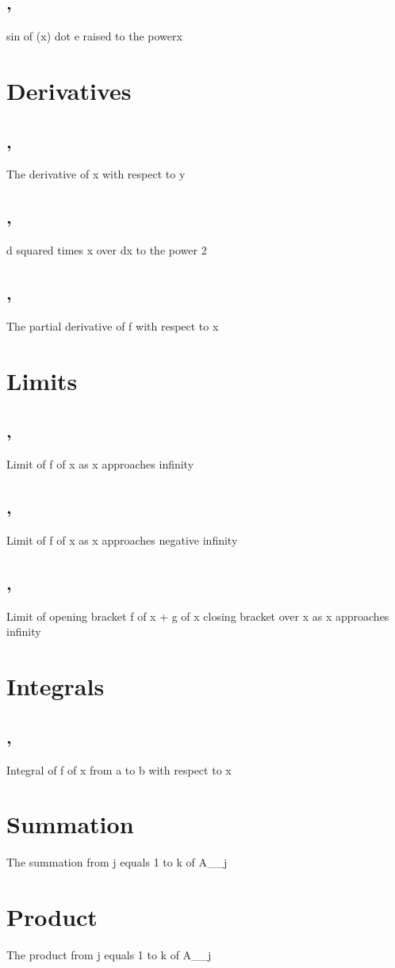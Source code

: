 \subsection*{,}
sin of (x) dot e raised to the powerx

\section*{Derivatives}

\subsection*{,}
The derivative of x with respect to y

\subsection*{,}
d squared times x over dx to the power 2

\subsection*{,}
The partial derivative of f with respect to x

\section*{Limits}

\subsection*{,}
Limit of f of x as x approaches infinity

\subsection*{,}
Limit of f of x as x approaches negative infinity

\subsection*{,}
Limit of opening bracket f of x + g of x closing bracket over x as x approaches infinity

\section*{Integrals}
\subsection*{,}
Integral of f of x from a to b with respect to x


\section*{Summation}

The summation from j equals 1 to k of A_{\alpha_j}




\section*{Product}
The product from j equals 1 to k of A_{\alpha_j}

